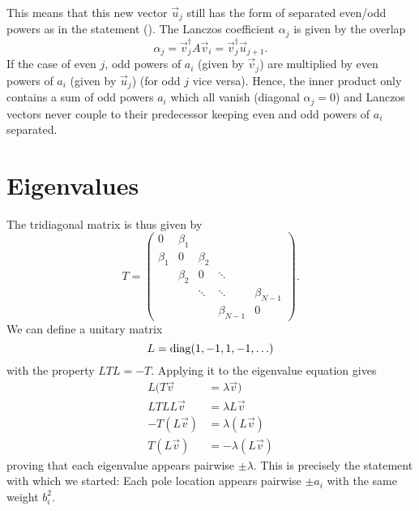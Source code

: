 This means that this new vector $\vec{u}_j$ still has the form of separated even/odd powers
as in the statement ().
The Lanczos coefficient $\alpha_j$ is given by the overlap
\begin{equation}
    \alpha_j
    =
    \vec{v}_j^\dagger A \vec{v}_i
    =
    \vec{v}_j^\dagger \vec{u}_{j+1}.
\end{equation}
If the case of even $j$, odd powers of $a_i$ (given by $\vec{v}_j$)
are multiplied by even powers of $a_i$ (given by $\vec{u}_j$)
(for odd $j$ vice versa).
Hence, the inner product only contains a sum of odd powers $a_i$ which all vanish
(diagonal $\alpha_j = 0$)
and Lanczos vectors never couple to their predecessor
keeping even and odd powers of $a_i$ separated.

\section{Eigenvalues}

The tridiagonal matrix is thus given by
\begin{equation}
    T
    =
    \begin{pmatrix}
        0       & \beta_1 &         &             &             \\
        \beta_1 & 0       & \beta_2 &             &             \\
                & \beta_2 & 0       & \ddots      &             \\
                &         & \ddots  & \ddots      & \beta_{N-1} \\
                &         &         & \beta_{N-1} & 0
    \end{pmatrix}.
\end{equation}
We can define a unitary matrix
\begin{equation}
    L = \operatorname{diag}(1, -1, 1, -1, \ldots)
\end{equation}
with the property $L T L = -T$.
Applying it to the eigenvalue equation gives
\begin{align}
    L(T \vec{v}   & = \lambda \vec{v})    \\
    LT LL\vec{v}  & = \lambda L\vec{v}    \\
    -T (L\vec{v}) & = \lambda (L\vec{v})  \\
    T (L\vec{v})  & = -\lambda (L\vec{v})
\end{align}
proving that each eigenvalue appears pairwise $\pm\lambda$.
This is precisely the statement with which we started:
Each pole location appears pairwise $\pm a_i$ with the same weight $b_i^2$.
